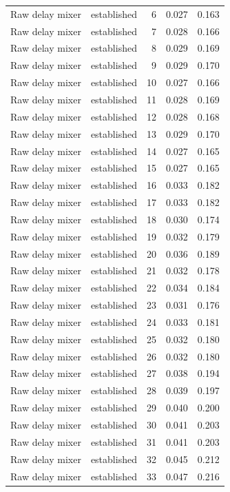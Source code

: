 \begin{tabular}{llrrr}
Raw delay mixer & established & 6 & 0.027 & 0.163 \\
Raw delay mixer & established & 7 & 0.028 & 0.166 \\
Raw delay mixer & established & 8 & 0.029 & 0.169 \\
Raw delay mixer & established & 9 & 0.029 & 0.170 \\
Raw delay mixer & established & 10 & 0.027 & 0.166 \\
Raw delay mixer & established & 11 & 0.028 & 0.169 \\
Raw delay mixer & established & 12 & 0.028 & 0.168 \\
Raw delay mixer & established & 13 & 0.029 & 0.170 \\
Raw delay mixer & established & 14 & 0.027 & 0.165 \\
Raw delay mixer & established & 15 & 0.027 & 0.165 \\
Raw delay mixer & established & 16 & 0.033 & 0.182 \\
Raw delay mixer & established & 17 & 0.033 & 0.182 \\
Raw delay mixer & established & 18 & 0.030 & 0.174 \\
Raw delay mixer & established & 19 & 0.032 & 0.179 \\
Raw delay mixer & established & 20 & 0.036 & 0.189 \\
Raw delay mixer & established & 21 & 0.032 & 0.178 \\
Raw delay mixer & established & 22 & 0.034 & 0.184 \\
Raw delay mixer & established & 23 & 0.031 & 0.176 \\
Raw delay mixer & established & 24 & 0.033 & 0.181 \\
Raw delay mixer & established & 25 & 0.032 & 0.180 \\
Raw delay mixer & established & 26 & 0.032 & 0.180 \\
Raw delay mixer & established & 27 & 0.038 & 0.194 \\
Raw delay mixer & established & 28 & 0.039 & 0.197 \\
Raw delay mixer & established & 29 & 0.040 & 0.200 \\
Raw delay mixer & established & 30 & 0.041 & 0.203 \\
Raw delay mixer & established & 31 & 0.041 & 0.203 \\
Raw delay mixer & established & 32 & 0.045 & 0.212 \\
Raw delay mixer & established & 33 & 0.047 & 0.216 \\

\end{tabular}
